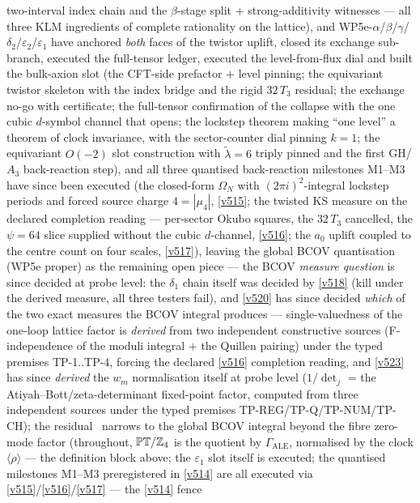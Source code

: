 \begin{itemize}
two-interval index chain and the $\beta$-stage split $+$ strong-additivity witnesses --- all three KLM
ingredients of complete rationality on the lattice), and WP5e-$\alpha$/$\beta$/$\gamma$/$\delta_2$/$\varepsilon_2$/$\varepsilon_1$ have anchored \emph{both}
faces of the twistor uplift, closed its exchange sub-branch, executed the full-tensor ledger,
executed the level-from-flux dial and built the bulk-axion slot
(the CFT-side prefactor $+$ level pinning; the equivariant twistor skeleton with the index bridge
and the rigid $32\,T_3$ residual; the exchange no-go with certificate; the full-tensor confirmation
of the collapse with the one cubic $d$-symbol channel that opens; the lockstep theorem making
``one level'' a theorem of clock invariance, with the sector-counter dial pinning $k=1$; the
equivariant $O(-2)$ slot construction with $\tilde\lambda=6$ triply pinned and the first GH/$A_3$
back-reaction step), and all three quantised back-reaction milestones M1--M3 have since been executed
(the closed-form $\Omega_N$ with $(2\pi i)^2$-integral lockstep periods and forced source charge
$4=|\mu_4|$, \vref{v515}; the twisted KS measure on the declared completion reading ---
per-sector Okubo squares, the $32\,T_3$ cancelled, the $\psi=64$ slice supplied without the
cubic $d$-channel, \vref{v516}; the $a_0$ uplift coupled to the centre count on four scales,
\vref{v517}),
leaving the global BCOV quantisation (WP5e proper) as the remaining open piece --- the BCOV
\emph{measure question} is since decided at probe level: the $\delta_1$ chain itself was decided
by \vref{v518} (kill under the derived measure, all three testers fail), and \vref{v520} has since
decided \emph{which} of the two exact measures the BCOV integral produces --- single-valuedness of
the one-loop lattice factor is \emph{derived} from two independent constructive sources
(F-independence of the moduli integral $+$ the Quillen pairing) under the typed premises
TP-1..TP-4, forcing the declared \vref{v516} completion reading, and \vref{v523} has since
\emph{derived} the $w_m$ normalisation itself at probe level ($1/\det_j$ = the
Atiyah--Bott/zeta-determinant fixed-point factor, computed from three independent sources
under the typed premises TP-REG/TP-Q/TP-NUM/TP-CH); the residual \mO\ narrows to the global
BCOV integral beyond the fibre zero-mode factor (throughout,
$\mathbb{PT}/\mathbb Z_4$ is the quotient by $\Gamma_{\mathrm{ALE}}$, normalised by the clock
$\langle\rho\rangle$ --- the definition block above; the
$\varepsilon_1$ slot itself is executed; the quantised milestones M1--M3 preregistered in
\vref{v514} are all executed via \vref{v515}/\vref{v516}/\vref{v517} --- the \vref{v514} fence

\end{itemize}
